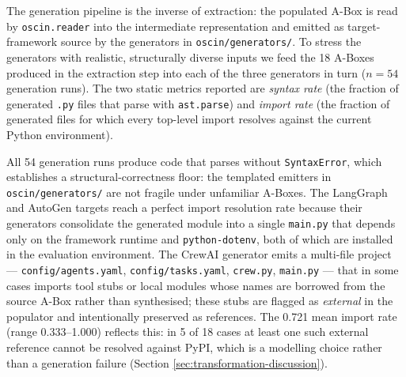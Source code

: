 The generation pipeline is the inverse of extraction: the populated
A-Box is read by \texttt{oscin.reader} into the intermediate
representation and emitted as target-framework source by the
generators in \texttt{oscin/generators/}. To stress the generators
with realistic, structurally diverse inputs we feed the 18 A-Boxes
produced in the extraction step into each of the three generators in
turn ($n{=}54$ generation runs). The two static metrics reported are
\emph{syntax rate} (the fraction of generated \texttt{.py} files that
parse with \texttt{ast.parse}) and \emph{import rate} (the fraction of
generated files for which every top-level import resolves against the
current Python environment).

\begin{table}[ht]
  \centering
  \small
  \caption{Generation pipeline syntactic validity, aggregated over
           the 18-system corpus. Range is per-system min/max of the
           import rate.}
  \label{tab:generation-validity}
\end{table}

All 54 generation runs produce code that parses without
\texttt{SyntaxError}, which establishes a structural-correctness floor:
the templated emitters in \texttt{oscin/generators/} are not fragile
under unfamiliar A-Boxes. The LangGraph and AutoGen targets reach a
perfect import resolution rate because their generators consolidate the
generated module into a single \texttt{main.py} that depends only on
the framework runtime and \texttt{python-dotenv}, both of which are
installed in the evaluation environment. The CrewAI generator emits a
multi-file project — \texttt{config/agents.yaml},
\texttt{config/tasks.yaml}, \texttt{crew.py}, \texttt{main.py} — that
in some cases imports tool stubs or local modules whose names are
borrowed from the source A-Box rather than synthesised; these stubs
are flagged as \emph{external} in the populator and intentionally
preserved as references. The 0.721 mean import rate (range
0.333–1.000) reflects this: in 5 of 18 cases at least one such
external reference cannot be resolved against PyPI, which is a
modelling choice rather than a generation failure (Section
\ref{sec:transformation-discussion}).

